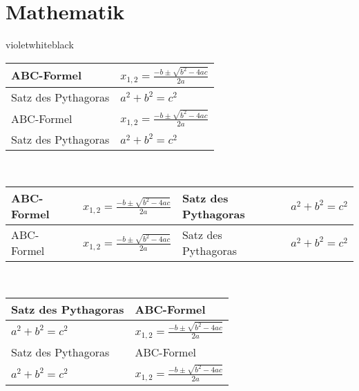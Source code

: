 \documentclass[./main.tex]{subfiles}
\begin{document}
	\section*{Mathematik}
	\begin{formulargroup}{violet}{white}{black}
		\begin{tabularx}{\linewidth}{|l|X|}\hline
			 ABC-Formel & $x_{1,2} = \frac{-b \pm \sqrt{b^2 - 4ac}}{2a}$\\\hline
			 Satz des Pythagoras & $a^2+b^2 = c^2$\\\hline
			 ABC-Formel & $x_{1,2} = \frac{-b \pm \sqrt{b^2 - 4ac}}{2a}$\\\hline
			 Satz des Pythagoras & $a^2+b^2 = c^2$\\\hline
		\end{tabularx}\\
		\noindent\begin{tabularx}{\linewidth}{|*{2}{l|X|}}\hline
			 ABC-Formel & $x_{1,2} = \frac{-b \pm \sqrt{b^2 - 4ac}}{2a}$ &  Satz des Pythagoras & $a^2+b^2 = c^2$\\\hline
			 ABC-Formel & $x_{1,2} = \frac{-b \pm \sqrt{b^2 - 4ac}}{2a}$ &  Satz des Pythagoras & $a^2+b^2 = c^2$\\\hline
		\end{tabularx}\\
		\begin{tabularx}{\linewidth}{|X|X|}\hline
			 Satz des Pythagoras &  ABC-Formel\\\hline
			$a^2+b^2 = c^2$ & $x_{1,2} = \frac{-b \pm \sqrt{b^2 - 4ac}}{2a}$ \\\hline
			 Satz des Pythagoras &  ABC-Formel\\\hline
			$a^2+b^2 = c^2$ & $x_{1,2} = \frac{-b \pm \sqrt{b^2 - 4ac}}{2a}$ \\\hline
		\end{tabularx}
	\end{formulargroup}
	
\end{document}
